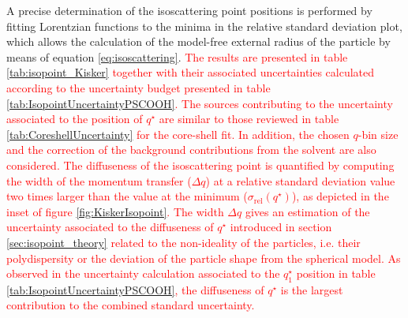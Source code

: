A precise determination of the isoscattering point positions is performed by fitting Lorentzian functions to the minima in the relative standard deviation plot, which allows the calculation of the model-free external radius of the particle by means of equation \ref{eq:isoscattering}. \textcolor{red}{The results are presented in table \ref{tab:isopoint_Kisker} together with their associated uncertainties calculated according to the uncertainty budget presented in table \ref{tab:IsopointUncertaintyPSCOOH}. The sources contributing to the uncertainty associated to the position of $q^{\star}$ are similar to those reviewed in table \ref{tab:CoreshellUncertainty} for the core-shell fit. In addition, the chosen $q$-bin size and the correction of the background contributions from the solvent are also considered. The diffuseness of the isoscattering point is quantified by computing the width of the momentum transfer ($\Delta q$) at a relative standard deviation value two times larger than the value at the minimum ($\sigma_{\text{rel}}(q^{\star})$), as depicted in the inset of figure \ref{fig:KiskerIsopoint}. The width $\Delta q$ gives an estimation of the uncertainty associated to the diffuseness of $q^{\star}$ introduced in section \ref{sec:isopoint_theory} related to the non-ideality of the particles, i.e. their polydispersity or the deviation of the particle shape from the spherical model. As observed in the uncertainty calculation associated to the $q_1^{\star}$ position in table \ref{tab:IsopointUncertaintyPSCOOH}, the diffuseness of $q^{\star}$ is the largest contribution to the combined standard uncertainty.} 

